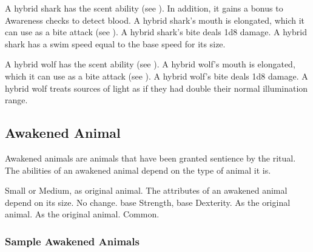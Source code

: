 
            \begin{itemize}
                 A hybrid shark has the scent ability (see ).
                    In addition, it gains a  bonus to Awareness checks to detect blood.
                 A hybrid shark's mouth is elongated, which it can use as a bite attack (see ).
                    A hybrid shark's bite deals 1d8 damage.
                 A hybrid shark has a swim speed equal to the base speed for its size.
            \end{itemize}


            \begin{itemize}
                 A hybrid wolf has the scent ability (see ).
                 A hybrid wolf's mouth is elongated, which it can use as a bite attack (see ).
                    A hybrid wolf's bite deals 1d8 damage.
                 A hybrid wolf treats sources of light as if they had double their normal illumination range.
            \end{itemize}

    \subsection{Awakened Animal}

        Awakened animals are animals that have been granted sentience by the  ritual.
        The abilities of an awakened animal depend on the type of animal it is.

         Small or Medium, as original animal.
         The attributes of an awakened animal depend on its size.
         No change.
          base Strength,  base Dexterity.
         As the original animal.
         As the original animal.
         Common.

        \subsubsection{Sample Awakened Animals}

